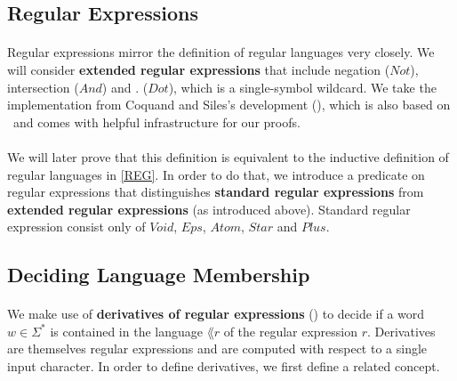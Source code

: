 \subsection{Regular Expressions}

\paragraph{} 
Regular expressions mirror the definition of regular languages very closely. 
We will consider \textbf{extended regular expressions} that include negation ($Not$), intersection ($And$) and $.$ ($Dot$), which is a single-symbol wildcard. 
We take the implementation from Coquand and Siles's development (\cite{DBLP:conf/cpp/CoquandS11}), which is also based on \ssreflect\ and comes with helpful infrastructure for our proofs.



\paragraph{}
We will later prove that this definition is equivalent to the inductive definition of regular languages in \ref{REG}.
In order to do that, we introduce a predicate on regular expressions that distinguishes \textbf{standard regular expressions} 
from \textbf{extended regular expressions} (as introduced above).
Standard regular expression consist only of $Void$, $Eps$, $Atom$, $Star$ and $Plus$.




\subsection{Deciding Language Membership}
\paragraph{}
We make use of \textbf{derivatives of regular expressions} (\cite{DBLP:journals/jacm/Brzozowski64}) to decide if a word $w \in \Sigma^*$ is contained in the language $\lang{r}$ of the regular expression $r$. 
Derivatives are themselves regular expressions and are computed with respect to a single input character. 
In order to define derivatives, we first define a related concept.

